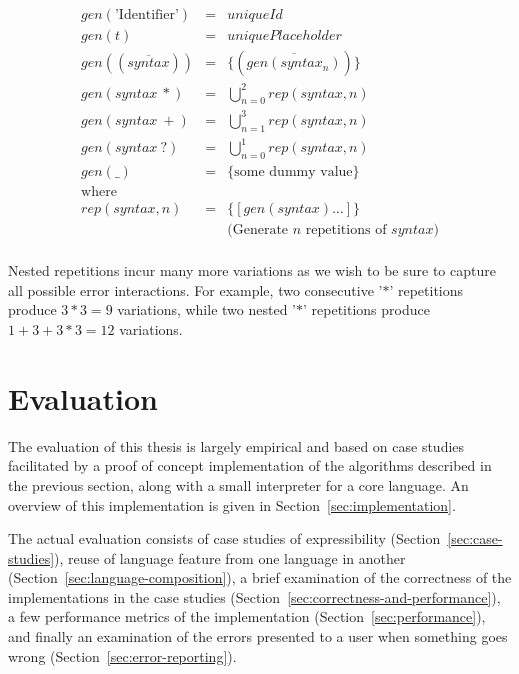 \documentclass{kththesis}
\begin{document}

$$
\begin{array}{rcl}
gen(\text{'Identifier'}) & = & uniqueId \\
gen(t) & = & uniquePlaceholder \\
gen((\overline{syntax})) & = & \{(\overline{gen(syntax_n)})\} \\
gen(syntax~*) & = & \bigcup_{n=0}^2 rep(syntax, n) \\
gen(syntax~+) & = & \bigcup_{n=1}^3 rep(syntax, n) \\
gen(syntax~?) & = & \bigcup_{n=0}^1 rep(syntax, n) \\
gen(\_) & = & \{\text{some dummy value}\} \\
\text{where} & & \\
rep(syntax, n) & = & \{[gen(syntax)\ldots]\} \\
& & \text{(Generate $n$ repetitions of $syntax$)} \\
\end{array}
$$

Nested repetitions incur many more variations as we wish to be sure to capture all possible error interactions. For example, two consecutive '$*$' repetitions produce $3 * 3 = 9$ variations, while two nested '$*$' repetitions produce $1 + 3 + 3*3 = 12$ variations.


\chapter{Evaluation} \label{sec:evaluation}

The evaluation of this thesis is largely empirical and based on case studies facilitated by a proof of concept implementation of the algorithms described in the previous section, along with a small interpreter for a core language. An overview of this implementation is given in Section~\ref{sec:implementation}.

The actual evaluation consists of case studies of expressibility (Section~\ref{sec:case-studies}), reuse of language feature from one language in another (Section~\ref{sec:language-composition}), a brief examination of the correctness of the implementations in the case studies (Section~\ref{sec:correctness-and-performance}), a few performance metrics of the implementation (Section~\ref{sec:performance}), and finally an examination of the errors presented to a user when something goes wrong (Section~\ref{sec:error-reporting}).
\end{document}
